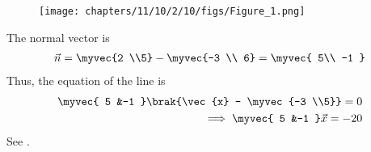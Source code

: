 	\begin{figure}[H]
		\centering
 \texttt{[image: chapters/11/10/2/10/figs/Figure\_1.png]}
		\caption{}
		\label{fig:11/10/2/10}
  	\end{figure}
The normal vector is
\begin{align}
\vec{n} =\myvec{2 \\5} -  \myvec{-3 \\ 6} 
=\myvec{
    5\\
    -1
}
\end{align}
Thus, the equation of the line is 
\begin{align}
\myvec{
    5 &-1
	}\brak{\vec{x} - \myvec{-3 \\5}}
= 0
\\
\implies 
\myvec{
    5 &-1
	}\vec{x} 
= -20
\end{align}
See 
		.

